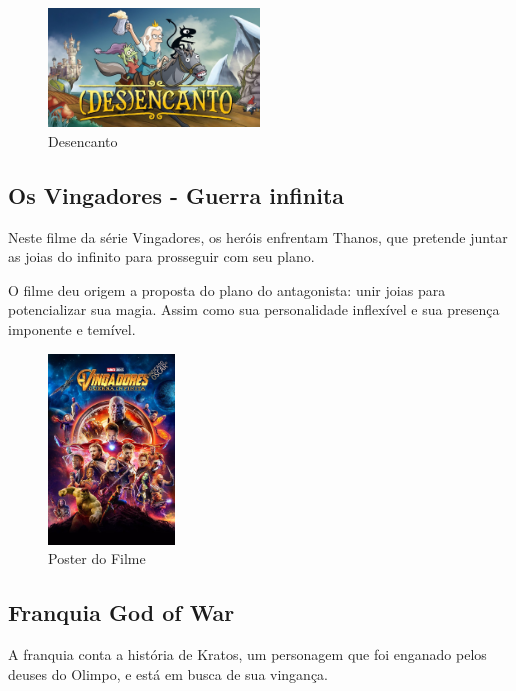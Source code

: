 \begin{figure}[!htb] \caption{\label{Desencanto}Desencanto} \begin{center}
\includegraphics[width=0.5\textwidth]{imagens/Desencanto.jpg} \end{center}
 \end{figure}

\clearpage

\subsection{Os Vingadores - Guerra infinita}

Neste filme da série Vingadores, os heróis enfrentam Thanos, que pretende juntar as joias do infinito para prosseguir com seu plano.

O filme deu origem a proposta do plano do antagonista: unir joias para potencializar sua magia. Assim como sua personalidade inflexível e sua presença imponente e temível.

\begin{figure}[!htb] \caption{\label{vingadores}Poster do Filme} \begin{center}
\includegraphics[width=0.3\textwidth]{imagens/vingadores.jpeg} \end{center}
 \end{figure}

\clearpage

\subsection{Franquia God of War}
A franquia conta a história de Kratos, um personagem que foi enganado pelos deuses do Olimpo, e está em busca de sua vingança.

